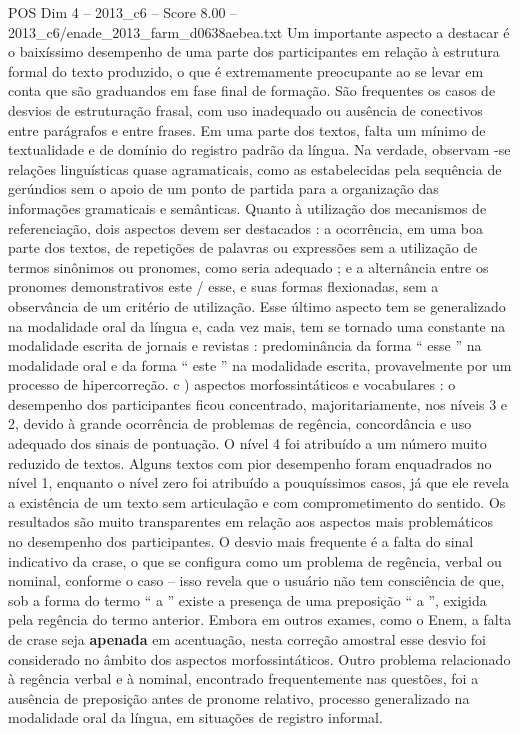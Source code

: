 \begin{textsample}{POS Dim 4 – 2013\_c6 – Score 8.00 – 2013\_c6/enade\_2013\_farm\_d0638aebea.txt}
Um importante aspecto a destacar é o baixíssimo desempenho de uma parte dos participantes em relação à estrutura formal do texto produzido, o que é extremamente preocupante ao se levar em conta que são graduandos em fase final de formação.
São frequentes os casos de desvios de estruturação frasal, com uso inadequado ou ausência de conectivos entre parágrafos e entre frases.
Em uma parte dos textos, falta um mínimo de textualidade e de domínio do registro padrão da língua.
Na verdade, observam -se relações linguísticas quase agramaticais, como as estabelecidas pela sequência de gerúndios sem o apoio de um ponto de partida para a organização das informações gramaticais e semânticas.
Quanto à utilização dos mecanismos de referenciação, dois aspectos devem ser destacados : a ocorrência, em uma boa parte dos textos, de repetições de palavras ou expressões sem a utilização de termos sinônimos ou pronomes, como seria adequado ; e a alternância entre os pronomes demonstrativos este / esse, e suas formas flexionadas, sem a observância de um critério de utilização.
Esse último aspecto tem se generalizado na modalidade oral da língua e, cada vez mais, tem se tornado uma constante na modalidade escrita de jornais e revistas : predominância da forma “ esse ” na modalidade oral e da forma “ este ” na modalidade escrita, provavelmente por um processo de hipercorreção. c ) aspectos morfossintáticos e vocabulares : o desempenho dos participantes ficou concentrado, majoritariamente, nos níveis 3 e 2, devido à grande ocorrência de problemas de regência, concordância e uso adequado dos sinais de pontuação.
O nível 4 foi atribuído a um número muito reduzido de textos.
Alguns textos com pior desempenho foram enquadrados no nível 1, enquanto o nível zero foi atribuído a pouquíssimos casos, já que ele revela a existência de um texto sem articulação e com comprometimento do sentido.
Os resultados são muito transparentes em relação aos aspectos mais problemáticos no desempenho dos participantes.
O desvio mais frequente é a falta do sinal indicativo da crase, o que se configura como um problema de regência, verbal ou nominal, conforme o caso – isso revela que o usuário não tem consciência de que, sob a forma do termo “ a ” existe a presença de uma preposição “ a ”, exigida pela regência do termo anterior.
Embora em outros exames, como o Enem, a falta de crase seja \textbf{apenada} em acentuação, nesta correção amostral esse desvio foi considerado no âmbito dos aspectos morfossintáticos.
Outro problema relacionado à regência verbal e à nominal, encontrado frequentemente nas questões, foi a ausência de preposição antes de pronome relativo, processo generalizado na modalidade oral da língua, em situações de registro informal.

\end{textsample}
